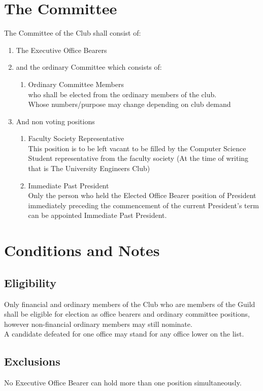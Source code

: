 \documentclass[10pt,a4paper]{report}
\begin{document}
	\section{The Committee}
	The Committee of the Club shall consist of:
	\begin{enumerate}[label=\alph*]
		\item The Executive Office Bearers
		\item and the ordinary Committee which consists of:
		\begin{enumerate}[label=\roman*]
			\item Ordinary Committee Members\\
			who shall be elected from the ordinary members of the club.\\
			Whose numbers/purpose may change depending on club demand
		\end{enumerate}
		\item And non voting positions
		\begin{enumerate}
			\item Faculty Society Representative\\
			This position is to be left vacant to be filled by the Computer Science Student representative from the faculty society (At the time of writing that is The University Engineers Club)
			\item Immediate Past President\\
			Only the person who held the Elected Office Bearer position of President immediately preceding the commencement of the current President's term can be appointed Immediate Past President.
		\end{enumerate}
	\end{enumerate}

	\section{Conditions and Notes}
		\subsection{Eligibility} Only financial and ordinary members of the Club who are members of the Guild shall be eligible for election as office bearers and ordinary committee positions, however non-financial ordinary members may still nominate.\\
		A candidate defeated for one office may stand for any office lower on the list.

		\subsection{Exclusions} No Executive Office Bearer can hold more than one position simultaneously.
\end{document}
